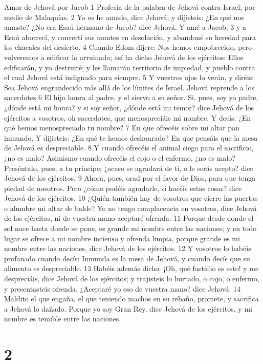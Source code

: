 

Amor de Jehová por Jacob
1 Profecía de la palabra de Jehová contra Israel, por medio de Malaquías.
2 Yo os he amado, dice Jehová; y dijisteis: ¿En qué nos amaste? ¿No era Esaú hermano de Jacob? dice Jehová. Y amé a Jacob,
3 y a Esaú aborrecí, y convertí sus montes en desolación, y abandoné su heredad para los chacales del desierto.
4 Cuando Edom dijere: Nos hemos empobrecido, pero volveremos a edificar lo arruinado; así ha dicho Jehová de los ejércitos: Ellos edificarán, y yo destruiré; y les llamarán territorio de impiedad, y pueblo contra el cual Jehová está indignado para siempre.
5 Y vuestros ojos lo verán, y diréis: Sea Jehová engrandecido más allá de los límites de Israel.
Jehová reprende a los sacerdotes
6 El hijo honra al padre, y el siervo a su señor. Si, pues, soy yo padre, ¿dónde está mi honra? y si soy señor, ¿dónde está mi temor? dice Jehová de los ejércitos a vosotros, oh sacerdotes, que menospreciáis mi nombre. Y decís: ¿En qué hemos menospreciado tu nombre?
7 En que ofrecéis sobre mi altar pan inmundo. Y dijisteis: ¿En qué te hemos deshonrado? En que pensáis que la mesa de Jehová es despreciable.
8 Y cuando ofrecéis el animal ciego para el sacrificio, ¿no es malo? Asimismo cuando ofrecéis el cojo o el enfermo, ¿no es malo? Preséntalo, pues, a tu príncipe; ¿acaso se agradará de ti, o le serás acepto? dice Jehová de los ejércitos.
9 Ahora, pues, orad por el favor de Dios, para que tenga piedad de nosotros. Pero ¿cómo podéis agradarle, si hacéis estas cosas? dice Jehová de los ejércitos.
10 ¿Quién también hay de vosotros que cierre las puertas o alumbre mi altar de balde? Yo no tengo complacencia en vosotros, dice Jehová de los ejércitos, ni de vuestra mano aceptaré ofrenda.
11 Porque desde donde el sol nace hasta donde se pone, es grande mi nombre entre las naciones; y en todo lugar se ofrece a mi nombre incienso y ofrenda limpia, porque grande es mi nombre entre las naciones, dice Jehová de los ejércitos.
12 Y vosotros lo habéis profanado cuando decís: Inmunda es la mesa de Jehová, y cuando decís que su alimento es despreciable.
13 Habéis además dicho: ¡Oh, qué fastidio es esto! y me despreciáis, dice Jehová de los ejércitos; y trajisteis lo hurtado, o cojo, o enfermo, y presentasteis ofrenda. ¿Aceptaré yo eso de vuestra mano? dice Jehová.
14 Maldito el que engaña, el que teniendo machos en su rebaño, promete, y sacrifica a Jehová lo dañado. Porque yo soy Gran Rey, dice Jehová de los ejércitos, y mi nombre es temible entre las naciones.

\chapter{2}

